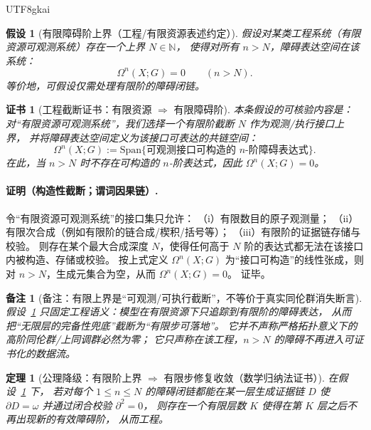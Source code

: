 \documentclass[12pt]{article}
\newtheorem{assumption}{假设}[section]
\newtheorem{theorem}{定理}[section]
\newtheorem{remark}{备注}[section]
\newtheorem{Certificate}{证书}[section]
\newcommand{\NN}{\mathbb{N}}
\newcommand{\KouJing}{\texorpdfstring{表述约定}{表述约定}}
\begin{document}
\begin{CJK*}{UTF8}{gkai}
\begin{assumption}[有限障碍阶上界（工程/有限资源\KouJing）]
\label{asm:tex29-ch15-finite-bound}
假设对某类工程系统（有限资源可观测系统）存在一个上界 $N\in\NN$，
使得对所有 $n>N$，障碍表达空间在该系统：
\[
  \Omega^n(X;G)=0\qquad (n>N).
\]
等价地，可假设仅需处理有限阶的障碍闭链。
\end{assumption}

\begin{Certificate}[工程截断证书：有限资源 $\Rightarrow$ 有限障碍阶]
\label{cert:tex29-ch15-finite-bound}
本条假设的可核验内容是：对“有限资源可观测系统”，我们选择一个有限阶截断 $N$ 作为观测/执行接口上界，
并将障碍表达空间定义为该接口可表达的共链空间：
\[
  \Omega^n(X;G):=\mathrm{Span}\{\text{可观测接口可构造的 $n$-阶障碍表达式}\}.
\]
在此，当 $n>N$ 时不存在可构造的 $n$-阶表达式，因此 $\Omega^n(X;G)=0$。
\end{Certificate}

\paragraph{证明（构造性截断；谓词因果链）.}
令“有限资源可观测系统”的接口集只允许：
（i）有限数目的原子观测量；
（ii）有限次合成（例如有限阶的链合成/楔积/括号等）；
（iii）有限阶的证据链存储与校验。
则存在某个最大合成深度 $N$，使得任何高于 $N$ 阶的表达式都无法在该接口内被构造、存储或校验。
按上式定义 $\Omega^n(X;G)$ 为“接口可构造”的线性张成，则对 $n>N$，生成元集合为空，从而 $\Omega^n(X;G)=0$。
证毕。

\begin{remark}[备注：有限上界是“可观测/可执行截断”，不等价于真实同伦群消失断言]
假设~\ref{asm:tex29-ch15-finite-bound} 只固定工程语义：模型在有限资源下只追踪到有限阶的障碍表达，
从而把“无限层的完备性兜底”截断为“有限步可落地”。
它并不声称严格拓扑意义下的高阶同伦群/上同调群必然为零；
它只声称在该工程，$n>N$ 的障碍不再进入可证书化的数据流。
\end{remark}

\begin{theorem}[公理降级：有限阶上界 $\Rightarrow$ 有限步修复收敛（数学归纳法证书）]
\label{thm:tex29-ch15-finite-converge}
在假设~\ref{asm:tex29-ch15-finite-bound} 下，
若对每个 $1\le n\le N$ 的障碍闭链都能在某一层生成证据链 $D$ 使 $\partial D=\omega$ 并通过闭合校验 $\partial^2=0$，
则存在一个有限层数 $K$ 使得在第 $K$ 层之后不再出现新的有效障碍阶，
从而工程。
\end{theorem}


\end{CJK*}
\end{document}
